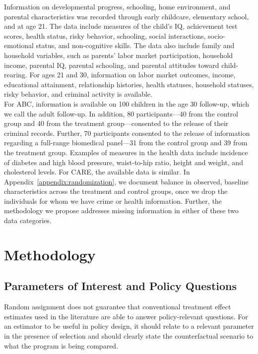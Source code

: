 

\noindent Information on developmental progress, schooling, home environment, and parental characteristics was recorded through early childcare, elementary school, and at age 21. The data include measures of the child's IQ, achievement test scores, health status, risky behavior, schooling, social interactions, socio-emotional status, and non-cognitive skills. The data also include family and household variables, such as parents' labor market participation, household income, parental IQ, parental schooling, and parental attitudes toward child-rearing. For ages 21 and 30, information on labor market outcomes, income, educational attainment, relationship histories, health statuses, household statuses, risky behavior, and criminal activity is available.\\

\noindent For ABC, information is available on 100 children in the age 30 follow-up, which we call the adult follow-up. In addition, 80 participants---40 from the control group and 40 from the treatment group---consented to the release of their criminal records. Further, 70 participants consented to the release of information regarding a full-range biomedical panel---31 from the control group and 39 from the treatment group. Examples of measures in the health data include incidence of diabetes and high blood pressure, waist-to-hip ratio, height and weight, and cholesterol levels. For CARE, the available data is similar. In Appendix~\ref{appendix:randomization}, we document balance in observed, baseline characteristics across the treatment and control groups, once we drop the individuals for whom we have crime or health information. Further, the methodology we propose addresses missing information in either of these two data categories.

\section{Methodology} \label{section:methodology}

\subsection{Parameters of Interest and Policy Questions} \label{section:methodsquestions}

\noindent Random assignment does not guarantee that conventional treatment effect estimates used in the literature are able to answer policy-relevant questions. For an estimator to be useful in policy design, it should relate to a relevant parameter in the presence of selection and should clearly state the counterfactual scenario to what the program is being compared.\\

